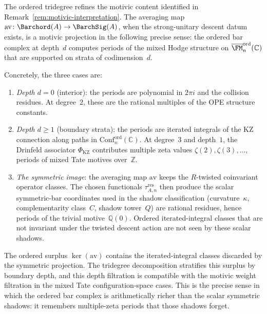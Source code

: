 \begin{remark}
\label{rem:tridegree-motivic}
The ordered tridegree refines the motivic content identified in
Remark~\ref{rem:motivic-interpretation}. The averaging map
$\mathrm{av}\colon\Barchord(A) \to \BarchSig(A)$, when the
strong-unitary descent datum exists, is a motivic projection in the
following precise sense: the ordered bar
complex at depth~$d$ computes periods of the mixed Hodge structure
on $\overline{\FM}_n^{\mathrm{ord}}(\mathbb{C})$ that are supported
on strata of codimension~$d$.

Concretely, the three cases are:
\begin{enumerate}[label=\textup{(\roman*)}]
\item \emph{Depth $d = 0$} (interior): the periods are polynomial in
$2\pi i$ and the collision residues. At degree~$2$, these are
the rational multiples of the OPE structure constants.

\item \emph{Depth $d \geq 1$} (boundary strata): the periods are
iterated integrals of the KZ connection along paths in
$\mathrm{Conf}_n^{\mathrm{ord}}(\mathbb{C})$. At degree~$3$ and
depth~$1$, the Drinfeld associator $\Phi_{\mathrm{KZ}}$
contributes multiple zeta values $\zeta(2), \zeta(3), \ldots$,
periods of mixed Tate motives over~$\mathbb{Z}$.

	\item \emph{The symmetric image}: the averaging map $\mathrm{av}$
	keeps the $R$-twisted coinvariant operator classes.  The chosen
	functionals $\tau_{A,n}^{\mathrm{res}}$ then produce the scalar
	symmetric-bar coordinates used in the shadow classification
	(curvature~$\kappa$, complementarity class~$C$, shadow
	tower~$Q$) are rational residues, hence periods of the trivial
	motive~$\mathbb{Q}(0)$. Ordered iterated-integral classes that are
	not invariant under the twisted descent action are not seen by these
	scalar shadows.
\end{enumerate}

\noindent
	The ordered surplus $\ker(\mathrm{av})$ contains the
	iterated-integral classes discarded by the symmetric projection. The
	tridegree decomposition stratifies this surplus by boundary depth,
	and this depth filtration is compatible with the motivic weight
	filtration in the mixed Tate configuration-space cases. This is the
	precise sense in which the ordered bar complex is arithmetically
	richer than the scalar symmetric shadows: it remembers
	multiple-zeta periods that those shadows forget.
\end{remark}

